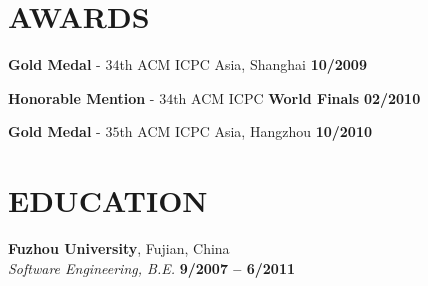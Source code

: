 \documentclass[margin,line]{resume}
\begin{document}
\begin{resume}
\begin{itemize}[leftmargin=3mm]
\iffalse
        \item upgrade hive version in production 
\fi

    \end{itemize}

    
\sectionline

    \section{\mysidestyle \textbf{\large{A}\small{WARDS}}} 

	\vspace{1mm} %

	\textbf{Gold Medal} - $34$th ACM ICPC Asia, Shanghai \hfill \textbf{10/2009}\vspace{-3mm}\\\vspace{-4mm}%

	\textbf{Honorable Mention} - $34$th ACM ICPC \textbf{World Finals} \hfill \textbf{02/2010}\vspace{-3mm}\\\vspace{-4mm}%

	\textbf{Gold Medal} - $35$th ACM ICPC Asia, Hangzhou \hfill \textbf{10/2010}\vspace{-3mm}\\\vspace{-3mm}%

\sectionline

    \section{\mysidestyle \textbf{\large{E}\small{DUCATION}}}

    \textbf{Fuzhou University}, Fujian, China \vspace{2mm}\\\vspace{-0.5mm}%
    \textsl{Software Engineering, B.E.} \hfill \textbf{  9/2007 -- 6/2011}\vspace{-5mm}\\\vspace{-1mm}%


\sectionline


\end{resume}
\end{document}
